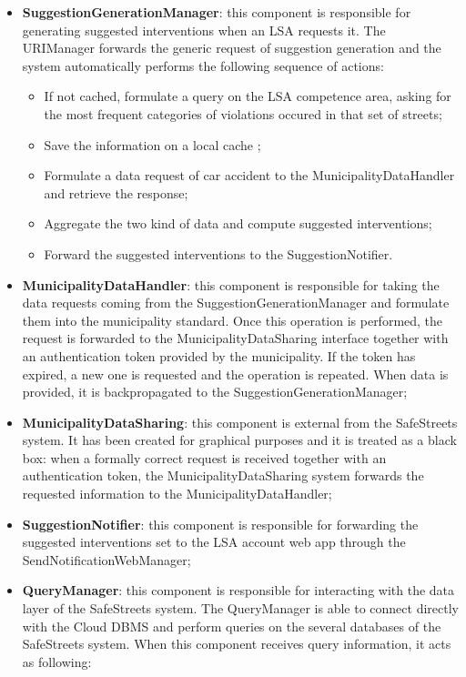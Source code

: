 \begin{itemize}
    \item \textbf{SuggestionGenerationManager}: this component is responsible for generating suggested interventions when an LSA requests it. The URIManager forwards the generic request of suggestion generation and the system automatically performs the following sequence of actions: 
    \begin{itemize}
        \item If not cached, formulate a query on the LSA competence area, asking for the most frequent categories of violations occured in that set of streets;
        \item Save the information on a local cache ;
        \item Formulate a data request of car accident to the MunicipalityDataHandler and retrieve the response;
        \item Aggregate the two kind of data and compute suggested interventions;
        \item Forward the suggested interventions to the SuggestionNotifier.
    \end{itemize}
    \item \textbf{MunicipalityDataHandler}: this component is responsible for taking the data requests coming from the SuggestionGenerationManager and formulate them into the municipality standard. Once this operation is performed, the request is forwarded to the MunicipalityDataSharing interface together with an authentication token provided by the municipality. If the token has expired, a new one is requested and the operation is repeated. When data is provided, it is backpropagated to the SuggestionGenerationManager;
    \item \textbf{MunicipalityDataSharing}: this component is external from the SafeStreets system. It has been created for graphical purposes and it is treated as a black box: when a formally correct request is received together with an authentication token, the MunicipalityDataSharing system forwards the requested information to the MunicipalityDataHandler;
    \item \textbf{SuggestionNotifier}: this component is responsible for forwarding the suggested interventions set to the LSA account web app through the SendNotificationWebManager;
    \item \textbf{QueryManager}: this component is responsible for interacting with the data layer of the SafeStreets system. The QueryManager is able to connect directly with the Cloud DBMS and perform queries on the several databases of the SafeStreets system. When this component receives query information, it acts as following: 

\end{itemize}
